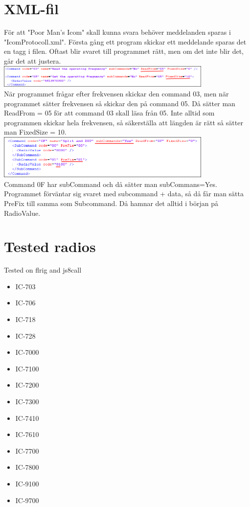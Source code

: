 \documentclass[a4paper]{article}
\begin{document}
\section*{XML-fil}
För att "Poor Man's Icom" skall kunna svara behöver meddelanden sparas i "IcomProtocoll.xml".
Första gång ett program skickar ett meddelande sparas det en tagg i filen. Oftast blir svaret till programmet rätt, men om det inte blir det, går det att justera.
\newline
\newline
\includegraphics[width=0.8\textwidth]{../image/xml_readfrom.png}\\[0.1cm] 
När programmet frågar efter frekvensen skickar den command 03, men när programmet sätter frekvensen så skickar den på command 05.
Då sätter man ReadFrom = 05 för att command 03 skall läsa från 05. Inte alltid som programmen skickar hela frekvensen, så säkerställa att längden är rätt så sätter man FixedSize = 10.
\newline
\newline
\includegraphics[width=0.8\textwidth]{../image/xml_subcommand.png}\\[0.1cm] 
Command 0F har subCommand och då sätter man subCommans=Yes.
\newline
Programmet förväntar sig svaret med subcommand + data, så då får man sätta PreFix till samma som Subcommand. Då hamnar det alltid i början på RadioValue.

\newpage

\section*{Tested radios}
Tested on flrig and js8call

\begin{itemize}   
\item IC-703
\item IC-706
\item IC-718
\item IC-728
\item IC-7000
\item IC-7100
\item IC-7200
\item IC-7300
\item IC-7410
\item IC-7610
\item IC-7700
\item IC-7800
\item IC-9100
\item IC-9700
\end{itemize}  
\end{document}
